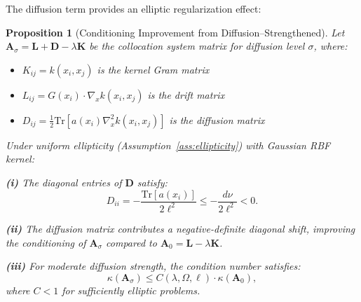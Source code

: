 \documentclass[11pt,a4paper]{article}
\newtheorem{proposition}[theorem]{Proposition}
\newcommand{\Tr}{\mathrm{Tr}}
\newcommand{\bA}{\mathbf{A}}
\newcommand{\bK}{\mathbf{K}}
\newcommand{\bL}{\mathbf{L}}
\newcommand{\bD}{\mathbf{D}}
\begin{document}
The diffusion term provides an elliptic regularization effect:

\begin{proposition}[Conditioning Improvement from Diffusion--Strengthened]\label{prop:conditioning}
Let $\bA_\sigma = \bL + \bD - \lambda \bK$ be the collocation system matrix for diffusion level $\sigma$, where:
\begin{itemize}
\item $K_{ij} = k(x_i, x_j)$ is the kernel Gram matrix
\item $L_{ij} = G(x_i) \cdot \nabla_x k(x_i, x_j)$ is the drift matrix
\item $D_{ij} = \frac{1}{2}\Tr[a(x_i) \nabla_x^2 k(x_i, x_j)]$ is the diffusion matrix
\end{itemize}
Under uniform ellipticity (Assumption~\ref{ass:ellipticity}) with Gaussian RBF kernel:

\textbf{(i)} The diagonal entries of $\bD$ satisfy:
\begin{equation}\label{eq:Dii_bound}
D_{ii} = -\frac{\Tr[a(x_i)]}{2\ell^2} \leq -\frac{d\nu}{2\ell^2} < 0.
\end{equation}

\textbf{(ii)} The diffusion matrix contributes a negative-definite diagonal shift, improving the conditioning of $\bA_\sigma$ compared to $\bA_0 = \bL - \lambda \bK$.

\textbf{(iii)} For moderate diffusion strength, the condition number satisfies:
\begin{equation}\label{eq:cond_bound}
\kappa(\bA_\sigma) \leq C(\lambda, \Omega, \ell) \cdot \kappa(\bA_0),
\end{equation}
where $C < 1$ for sufficiently elliptic problems.
\end{proposition}
\end{document}
